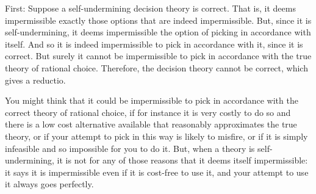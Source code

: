 \documentclass[a4paper]{article}
\newcommand{\todoinfo}[2][]{\todo[inline,{#1}]{#2}}
\renewcommand{\color}[1]{}
\newenvironment{colored}[1]{\leavevmode\color{#1}}{}
\newenvironment{CCM rewritten}
{\begingroup\color{blue}} %
{\endgroup}              %
\begin{document}
\begin{colored}{violet}
	
First: Suppose a self-undermining decision theory is correct. That is, it deems impermissible exactly those options that are indeed impermissible. But, since it is self-undermining, it deems impermissible the option of picking in accordance with itself. And so it is indeed impermissible to pick in accordance with it, since it is correct. But surely it cannot be impermissible to pick in accordance with the true theory of rational choice. Therefore, the decision theory cannot be correct, which gives a reductio.

You might think that it could be impermissible to pick in accordance with the correct theory of rational choice, if for instance it is very costly to do so and there is a low cost alternative available that reasonably approximates the true theory, or if your attempt to pick in this way is likely to misfire, or if it is simply infeasible and so impossible for you to do it. But, when a theory is self-undermining, it is not for any of those reasons that it deems itself impermissible: it says it is impermissible even if it is cost-free to use it, and your attempt to use it always goes perfectly.



\end{colored}
\end{document}
